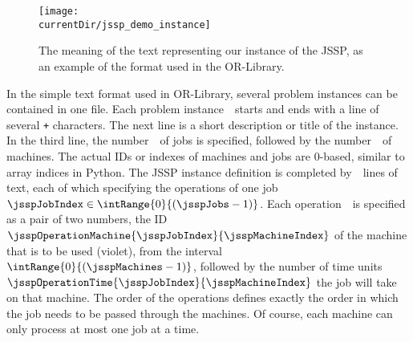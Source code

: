\begin{figure}%
\centering%
\texttt{[image: \\currentDir/jssp\_demo\_instance]}%
\caption{The meaning of the text representing our  instance of the JSSP, as an example of the format used in the OR-Library.}%
\label{fig:jssp_demo_instance}%
\end{figure}

In the simple text format used in OR-Library, several problem instances can be contained in one file.
Each problem instance~\instance\ starts and ends with a line of several \texttt{+} characters.
The next line is a short description or title of the instance.
In the third line, the number~\jsspJobs\ of jobs is specified, followed by the number~\jsspMachines\ of machines.
The actual IDs or indexes of machines and jobs are 0-based, similar to array indices in Python.
The JSSP instance definition is completed by~\jsspJobs\ lines of text, each of which specifying the operations of one job~$\jsspJobIndex\in\intRange{0}{(\jsspJobs-1)}$.
Each operation~\jsspMachineIndex\ is specified as a pair of two numbers, the ID~$\jsspOperationMachine{\jsspJobIndex}{\jsspMachineIndex}$ of the machine that is to be used (violet), from the interval~$\intRange{0}{(\jsspMachines-1)}$, followed by the number of time units~$\jsspOperationTime{\jsspJobIndex}{\jsspMachineIndex}$ the job will take on that machine.
The order of the operations defines exactly the order in which the job needs to be passed through the machines.
Of course, each machine can only process at most one job at a time.

